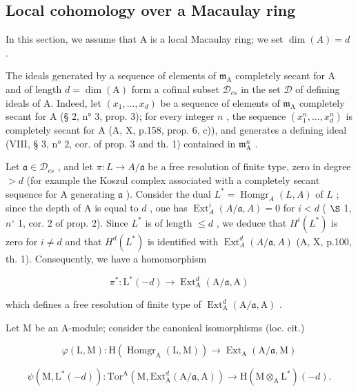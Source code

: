 \subsection{Local cohomology over a Macaulay ring}

In this section, we assume that A is a local Macaulay ring; we set \(\dim(A) = d\) .

The ideals generated by a sequence of elements of \(\mathfrak{m}_{\mathrm{A}}\) completely secant for A and of length \(d = \dim (\mathrm{A})\) form a cofinal subset \(\mathcal{D}_{cs}\) in the set \(\mathcal{D}\) of defining ideals of A. Indeed, let \((x_{1},\ldots ,x_{d})\) be a sequence of elements of \(\mathfrak{m}_{\mathrm{A}}\) completely secant for A (§ 2, n° 3, prop. 3); for every integer \(n\) , the sequence \((x_1^n,\dots ,x_d^n)\) is completely secant for A (A, X, p.158, prop. 6, c)), and generates a defining ideal (VIII, § 3, n° 2, cor. of prop. 3 and th. 1) contained in \(\mathfrak{m}_{\mathrm{A}}^n\) .

Let \(\mathfrak{a} \in \mathcal{D}_{cs}\) , and let \(\pi: L \to A/\mathfrak{a}\) be a free resolution of finite type, zero in degree \(>d\) (for example the Koszul complex associated with a completely secant sequence for A generating \(\mathfrak{a}\) ). Consider the dual \(L^{*} = \operatorname{Homgr}_{A}(L,A)\) of \(L\) ; since the depth of A is equal to \(d\) , one has \(\operatorname{Ext}_{A}^{i}(A/\mathfrak{a}, A) = 0\) for \(i < d\) ( \(\S\) 1, \(n^{\circ}\) 1, cor. 2 of prop. 2). Since \(L^{*}\) is of length \(\leqslant d\) , we deduce that \(H^{i}(L^{*})\) is zero for \(i \neq d\) and that \(H^{d}(L^{*})\) is identified with \(\operatorname{Ext}_{A}^{d}(A/\mathfrak{a}, A)\) (A, X, p.100, th. 1). Consequently, we have a homomorphism

\[
\pi^ {*}: \mathrm{L} ^ {*} (- d) \longrightarrow \operatorname{Ext} _ {\mathrm{A}} ^ {d} (\mathrm{A} / \mathfrak {a}, \mathrm{A})
\]

which defines a free resolution of finite type of \(\operatorname{Ext}_{\mathrm{A}}^{d}(\mathrm{A}/\mathfrak{a},\mathrm{A})\) .

Let M be an A-module; consider the canonical isomorphisms (loc. cit.)

\[
\varphi (\mathrm{L}, \mathrm{M}): \mathrm{H} (\operatorname{Homgr} _ {\mathrm{A}} (\mathrm{L}, \mathrm{M})) \rightarrow \operatorname{Ext} _ {\mathrm{A}} (\mathrm{A} / \mathfrak {a}, \mathrm{M})
\]

\[
\psi (\mathrm{M}, \mathrm{L} ^ {*} (- d)): \mathrm{Tor} ^ {\mathrm{A}} (\mathrm{M}, \mathrm{Ext} _ {\mathrm{A}} ^ {d} (\mathrm{A} / \mathfrak {a}, \mathrm{A})) \to \mathrm{H} (\mathrm{M} \otimes_ {\mathrm{A}} \mathrm{L} ^ {*}) (- d).
\]

